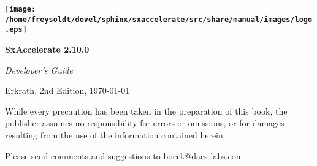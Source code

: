 \thispagestyle{empty}\vspace*{.2\textheight}


\begin{flushright}
\textbf{\Huge \texttt{[image: /home/freysoldt/devel/sphinx/sxaccelerate/src/share/manual/images/logo.eps]}}
\par\end{flushright}{\Huge \par}

\begin{flushright}
\textbf{\Huge SxAccelerate 2.10.0}
\par\end{flushright}{\Huge \par}

\begin{flushright}
{\Huge \hrulefill}
\par\end{flushright}{\Huge \par}

\begin{flushright}
\emph{\Huge Developer's Guide}
\par\end{flushright}{\Huge \par}

\newpage{}

\textbf{\Huge \thispagestyle{empty}}{\Huge \par}

{\small Erkrath, 2nd Edition, \today}{\small \par}

\vspace*{11cm}
While every precaution has been taken in the preparation of this book,
the publisher assumes no responsibility for errors or omissions, or
for damages resulting from the use of the information contained herein.
\vspace{1em}

Please send comments and suggestions to boeck@dacs-labs.com\newpage{}
